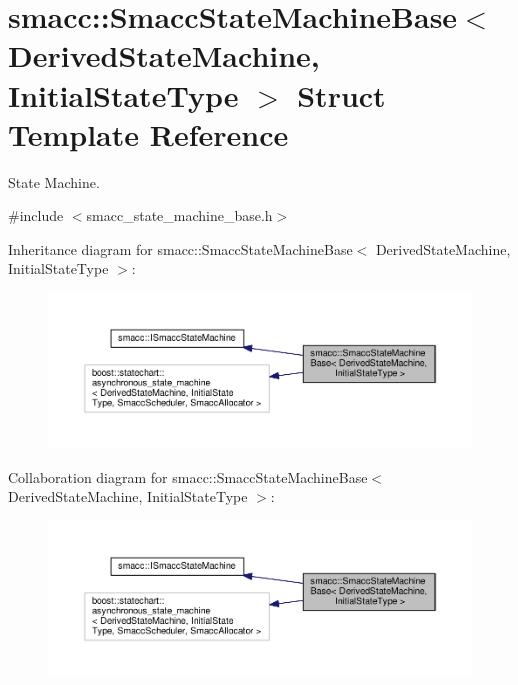 \hypertarget{structsmacc_1_1SmaccStateMachineBase}{\section{smacc\-:\-:Smacc\-State\-Machine\-Base$<$ Derived\-State\-Machine, Initial\-State\-Type $>$ Struct Template Reference}
\label{structsmacc_1_1SmaccStateMachineBase}
}


State Machine.  




{\ttfamily \#include $<$smacc\-\_\-state\-\_\-machine\-\_\-base.\-h$>$}



Inheritance diagram for smacc\-:\-:Smacc\-State\-Machine\-Base$<$ Derived\-State\-Machine, Initial\-State\-Type $>$\-:
\nopagebreak
\begin{figure}[H]
\begin{center}
\leavevmode
\includegraphics[width=350pt]{structsmacc_1_1SmaccStateMachineBase__inherit__graph}
\end{center}
\end{figure}


Collaboration diagram for smacc\-:\-:Smacc\-State\-Machine\-Base$<$ Derived\-State\-Machine, Initial\-State\-Type $>$\-:
\nopagebreak
\begin{figure}[H]
\begin{center}
\leavevmode
\includegraphics[width=350pt]{structsmacc_1_1SmaccStateMachineBase__coll__graph}
\end{center}
\end{figure}
